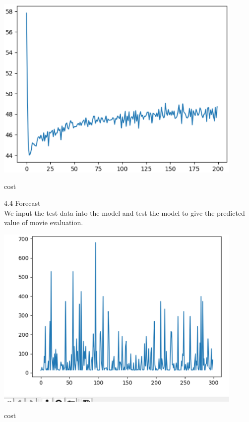 \begin{center}

  \begin{minipage}{0.3\linewidth}
  \centering

  \includegraphics[width=0.9\textwidth]{logos/1 (2).eps}
  
  {\small{cost}}

  \end{minipage}
\end{center}

4.4 Forecast\\
We input the test data into the model and test the model to give the predicted value of movie evaluation.
\begin{center}

  \begin{minipage}{0.3\linewidth}
  \centering

  \includegraphics[width=0.9\textwidth]{logos/1 (3).eps}
  
  {\small{cost}}

  \end{minipage}
\end{center}
